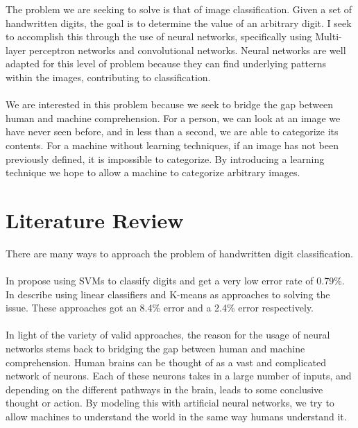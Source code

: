 \documentclass[12pt,twoside]{article} %
\begin{document}
The problem we are seeking to solve is that of image classification. Given a set of handwritten digits, the goal is to determine the value of an arbitrary digit. I seek to accomplish this through the use of neural networks, specifically using Multi-layer perceptron networks and convolutional networks. Neural networks are well adapted for this level of problem because they can find underlying patterns within the images, contributing to classification. 
\\\\
We are interested in this problem because we seek to bridge the gap between human and machine comprehension. For a person, we can look at an image we have never seen before, and in less than a second, we are able to categorize its contents. For a machine without learning techniques, if an image has not been previously defined, it is impossible to categorize. By introducing a learning technique we hope to allow a machine to categorize arbitrary images.

\section{Literature Review}  %

There are many ways to approach the problem of handwritten digit classification.
\\\\
In \cite{FastAndAccurate} propose using SVMs to classify digits and get a very low error rate of 0.79\%. In \cite{LearningAlgorithmsForClassification} describe using linear classifiers and K-means as approaches to solving the issue. These approaches got an 8.4\% error and a 2.4\% error respectively.
\\\\
In light of the variety of valid approaches, the reason for the usage of neural networks stems back to bridging the gap between human and machine comprehension. Human brains can be thought of as a vast and complicated network of neurons. Each of these neurons takes in a large number of inputs, and depending on the different pathways in the brain, leads to some conclusive thought or action. By modeling this with artificial neural networks, we try to allow machines to understand the world in the same way humans understand it.
\end{document}
